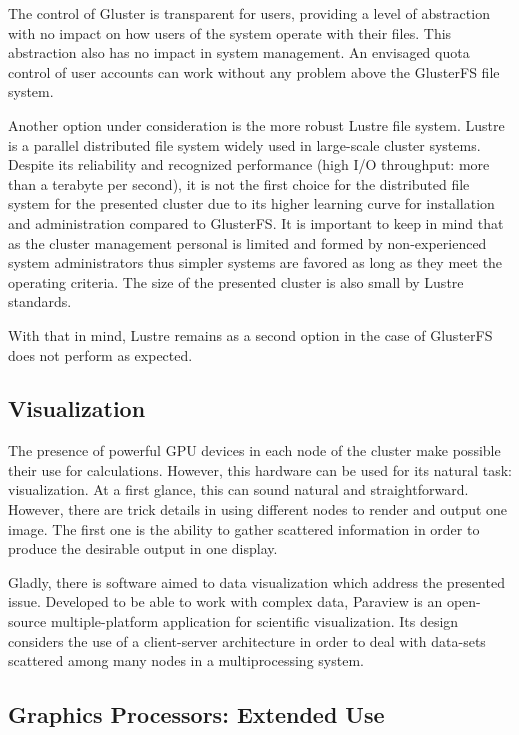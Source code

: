 \documentclass[twoside,a4paper,12pt,english]{inac17}
\begin{document}
The control of Gluster is transparent for users, providing a level of abstraction with no impact on how users of the system operate with their files. This
abstraction also has no impact in system management. An envisaged quota control of user accounts can work without any problem above the GlusterFS file system.

Another option under consideration is the more robust Lustre file system\cite{lustre}. Lustre is a parallel distributed file system widely used in large-scale
cluster systems. Despite its reliability and recognized performance (high I/O throughput: more than a terabyte per second), it is not the first choice
for the distributed file system for the presented cluster due to its higher learning curve for installation and administration compared to GlusterFS.
It is important to keep in mind that as the cluster management personal is limited and formed by non-experienced system
administrators thus simpler systems are favored as long as they meet the operating criteria. The size of the presented cluster is also small by Lustre standards.

With that in mind, Lustre remains as a second option in the case of GlusterFS does not perform as expected. 

\subsection{Visualization}

The presence of powerful GPU devices in each node of the cluster make possible their use for calculations. However,
this hardware can be used for its natural task: visualization. At a first glance, this can sound natural and
straightforward. However, there are trick details in using different nodes to render and output one image. The first one
is the ability to gather scattered information in order to produce the desirable output in one display.

Gladly, there is software aimed to data visualization which address the presented issue. Developed to be able to work with complex data,
Paraview\cite{paraview} is an open-source multiple-platform application for scientific visualization. Its design considers
the use of a client-server architecture in order to deal with data-sets scattered among many nodes in a multiprocessing
system. 


\subsection{Graphics Processors: Extended Use}
\end{document}
